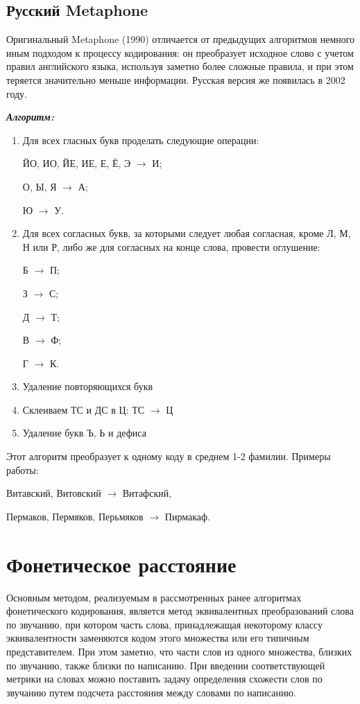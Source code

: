 \documentclass[titlepage,12pt]{article}
\begin{document}
\subsection{Русский Metaphone}

Оригинальный Metaphone (1990) отличается от предыдущих алгоритмов немного иным подходом к процессу кодирования: он преобразует исходное слово с учетом правил английского языка, используя заметно более сложные правила, и при этом теряется значительно меньше информации. Русская версия же появилась в 2002 году.

\textit{\textbf{Алгоритм:}}
\begin{enumerate}

\item Для всех гласных букв проделать следующие операции:

ЙО, ИО, ЙЕ, ИЕ, Е, Ё, Э $\rightarrow$ И;

О, Ы, Я $\rightarrow$ А;

Ю $\rightarrow$ У.
\item Для всех согласных букв, за которыми следует любая согласная, кроме Л, М, Н или Р, либо же для согласных на конце слова, провести оглушение:

Б $\rightarrow$ П;

З $\rightarrow$ С;

Д $\rightarrow$ Т;

В $\rightarrow$ Ф;

Г $\rightarrow$ К.

\item Удаление повторяющихся букв

\item Склеиваем ТС и ДС в Ц: ТС $\rightarrow$ Ц

\item Удаление букв Ъ, Ь и дефиса
\end{enumerate}


Этот алгоритм преобразует к одному коду в среднем 1-2 фамилии. Примеры работы: 

Витавский, Витовский $\rightarrow$ Витафский, 

Пермаков, Пермяков, Перьмяков $\rightarrow$ Пирмакаф.

\newpage
\section{Фонетическое расстояние}

Основным методом, реализуемым в рассмотренных ранее
алгоритмах фонетического кодирования, является метод эквивалентных преобразований слова по звучанию, при котором часть
слова, принадлежащая некоторому классу эквивалентности заменяются кодом этого множества или его типичным представителем.
При этом заметно, что части слов из одного множества,
близких по звучанию, также близки по написанию. При введении соответствующей метрики на словах можно поставить
задачу определения схожести слов по звучанию путем подсчета
расстояния между словами по написанию.
\end{document}
